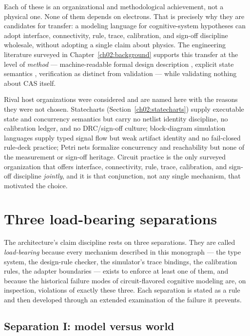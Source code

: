 Each of these is an organizational and methodological achievement, not a
physical one. None of them depends on electrons. That is precisely why they
are candidates for transfer: a modeling language for cognitive-system
hypotheses can adopt interface, connectivity, rule, trace, calibration, and
sign-off discipline wholesale, without adopting a single claim about
physics. The engineering literature surveyed in
Chapter~\ref{ch02:background} supports this transfer at the level of
\emph{method} --- machine-readable formal design description \cite{vhdl},
explicit state semantics \cite{harel}, verification as distinct from
validation \cite{sargent} --- while validating nothing about CAS itself.

Rival host organizations were considered and are named here with the reasons
they were not chosen. Statecharts (Section~\ref{ch02:statecharts}) supply
executable state and concurrency semantics but carry no netlist identity
discipline, no calibration ledger, and no DRC/sign-off culture;
block-diagram simulation languages supply typed signal flow but weak
artifact identity and no fail-closed rule-deck practice; Petri nets
formalize concurrency and reachability but none of the measurement or
sign-off heritage. Circuit practice is the only surveyed organization that
offers interface, connectivity, rule, trace, calibration, and sign-off
discipline \emph{jointly}, and it is that conjunction, not any single
mechanism, that motivated the choice.

\section{Three load-bearing separations}\label{ch01:separations}

The architecture's claim discipline rests on three separations. They are
called \emph{load-bearing} because every mechanism described in this
monograph --- the type system, the design-rule checker, the simulator's trace
bindings, the calibration rules, the adapter boundaries --- exists to enforce
at least one of them, and because the historical failure modes of
circuit-flavored cognitive modeling are, on inspection, violations of exactly
these three. Each separation is stated as a rule and then developed through
an extended examination of the failure it prevents.

\subsection{Separation I: model versus world}\label{ch01:sep:modelworld}

